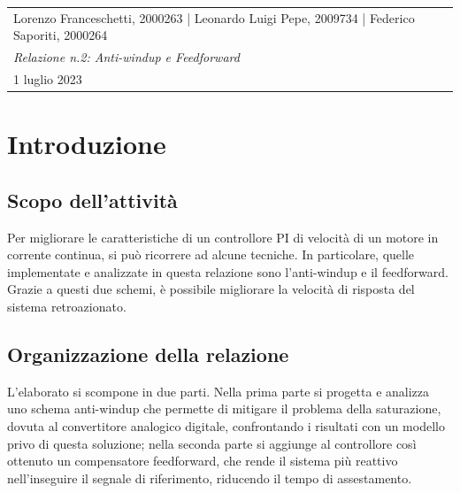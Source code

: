 \documentclass[a4paper, 11pt, Arial]{article}
\newcommand{\class}{Laboratorio di Automatica}
\newcommand{\expT}{Anti-windup e Feedforward}
\newcommand{\repN}{2}
\newcommand{\stud}{Lorenzo Franceschetti, 2000263 | Leonardo Luigi Pepe, 2009734 | 
 Federico Saporiti, 2000264}
\newcommand{\dateD}{1 luglio 2023}
\begin{document}

\begin{center}
\begin{tabular}{| p{\textwidth} |}
    \hline
    \large
    \vspace{-2pt}
    \stud \hfill
    \Large
    \begin{center}
    {\color{BrickRed}
        \textsl{\class}\\
        \textsl{Relazione n.\repN: \expT}\\
        \large
        \dateD}
    \vspace{-4mm}
    \end{center}\\
    \hline
\end{tabular}
\end{center}

\section{Introduzione}
\subsection{Scopo dell'attività}
Per migliorare le caratteristiche di un controllore PI di velocità di un motore in corrente continua, si può ricorrere ad alcune tecniche. In particolare, quelle implementate e analizzate in questa relazione sono l'anti-windup e il feedforward. Grazie a questi due schemi, è possibile migliorare la velocità di risposta del sistema retroazionato.

\subsection{Organizzazione della relazione}
L'elaborato si scompone in due parti. Nella prima parte si progetta e analizza uno schema anti-windup che permette di mitigare il problema della saturazione, dovuta al convertitore analogico digitale, confrontando i risultati con un modello privo di questa soluzione; nella seconda parte si aggiunge al controllore così ottenuto un compensatore feedforward, che rende il sistema più reattivo nell'inseguire il segnale di riferimento, riducendo il tempo di assestamento.
\end{document}
